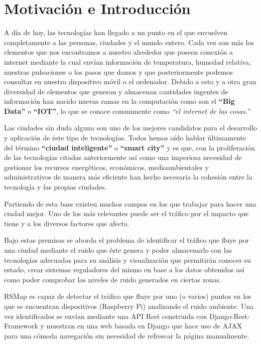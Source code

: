 \chapter{Motivación e Introducción}

A día de hoy, las tecnologías han llegado a un punto en el que envuelven completamente a las personas, ciudades y el mundo entero. Cada vez son más los elementos que nos encontramos a nuestro alrededor que poseen conexión a internet mediante la cual envían información de temperatura, humedad relativa, nuestras pulsaciones o los pasos que damos y que posteriormente podemos consultar en nuestro dispositivo móvil o el ordenador. Debido a esto y a otra gran diversidad de elementos que generan y almacenan cantidades ingentes de información han nacido nuevas ramas en la computación como son el \textbf{``Big Data''} o \textbf{``IOT''}, lo que se conoce comunmente como \textit{``el internet de las cosas.''}

\bigskip
Las ciudades sin duda alguna son uno de los mejores candidatos para el desarrollo y aplicación de éste tipo de tecnologías. Todos hemos oído hablar últimamente del término \textbf{``ciudad inteligente''} o \textbf{``smart city''} y es que, con la proliferación de las tecnologías citadas anteriormente así como una imperiosa necesidad de gestionar los recursos energéticos, económicos, medioambientales y administrativos de manera más eficiente han hecho necesaria la cohesión entre la tecnología y las propias ciudades.

\bigskip
Partiendo de esta base existen muchos campos en los que trabajar para hacer una ciudad mejor. Uno de los más relevantes puede ser el tráfico por el impacto que tiene y a los diversos factores que afecta.

\bigskip
Bajo estas premisas se aborda el problema de identificar el tráfico que fluye por una ciudad mediante el ruido que éste genera y poder almacenarlo con las tecnologías adecuadas para su análisis y visualización que permitirán conocer su estado, crear sistemas reguladores del mismo en base a los datos obtenidos así como poder comprobar los niveles de ruido generados en ciertas zonas.

\newpage

RSMap es capaz de detectar el tráfico que fluye por uno (o varios) puntos en los que se encuentran dispositivos (Raspberry Pi) analizando el ruido ambiente. Una vez identificados se envían mediante una API Rest construida con Django-Rest-Framework y muestran en una web basada en Django que hace uso de AJAX para una cómoda navegación sin necesidad de refrescar la página manualmente.

